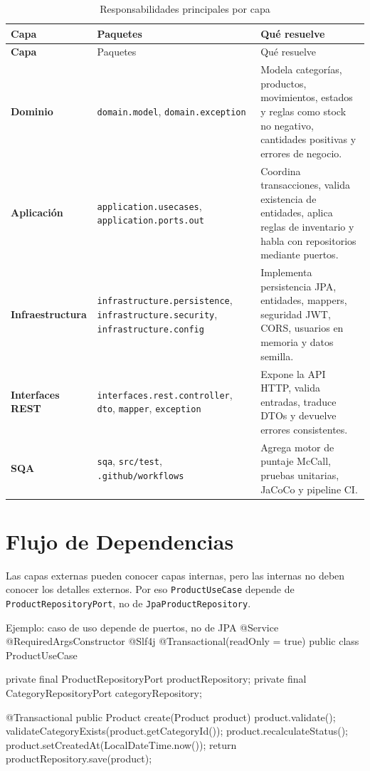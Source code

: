 \documentclass[11pt,oneside]{report}
\newcommand{\pathcode}[1]{{\ttfamily\scriptsize\nolinkurl{#1}}}
\begin{document}
\begin{longtable}{>{\bfseries}p{3.1cm} p{5.2cm} p{6.6cm}}
\caption{Responsabilidades principales por capa}\\
\toprule
Capa & Paquetes & Qué resuelve \\
\midrule
\endfirsthead
\toprule
Capa & Paquetes & Qué resuelve \\
\midrule
\endhead
Dominio & \pathcode{domain.model}, \pathcode{domain.exception} & Modela categorías, productos, movimientos, estados y reglas como stock no negativo, cantidades positivas y errores de negocio.\\
Aplicación & \pathcode{application.usecases}, \pathcode{application.ports.out} & Coordina transacciones, valida existencia de entidades, aplica reglas de inventario y habla con repositorios mediante puertos.\\
Infraestructura & \pathcode{infrastructure.persistence}, \pathcode{infrastructure.security}, \pathcode{infrastructure.config} & Implementa persistencia JPA, entidades, mappers, seguridad JWT, CORS, usuarios en memoria y datos semilla.\\
Interfaces REST & \pathcode{interfaces.rest.controller}, \pathcode{dto}, \pathcode{mapper}, \pathcode{exception} & Expone la API HTTP, valida entradas, traduce DTOs y devuelve errores consistentes.\\
SQA & \pathcode{sqa}, \pathcode{src/test}, \pathcode{.github/workflows} & Agrega motor de puntaje McCall, pruebas unitarias, JaCoCo y pipeline CI.\\
\bottomrule
\end{longtable}

\section{Flujo de Dependencias}

\begin{infobox}
Las capas externas pueden conocer capas internas, pero las internas no deben conocer los detalles externos. Por eso \texttt{ProductUseCase} depende de \texttt{ProductRepositoryPort}, no de \texttt{JpaProductRepository}.
\end{infobox}

\begin{codewindow}[language=Java]{Ejemplo: caso de uso depende de puertos, no de JPA}
@Service
@RequiredArgsConstructor
@Slf4j
@Transactional(readOnly = true)
public class ProductUseCase {

    private final ProductRepositoryPort productRepository;
    private final CategoryRepositoryPort categoryRepository;

    @Transactional
    public Product create(Product product) {
        product.validate();
        validateCategoryExists(product.getCategoryId());
        product.recalculateStatus();
        product.setCreatedAt(LocalDateTime.now());
        return productRepository.save(product);
    }
}
\end{codewindow}
\end{document}
